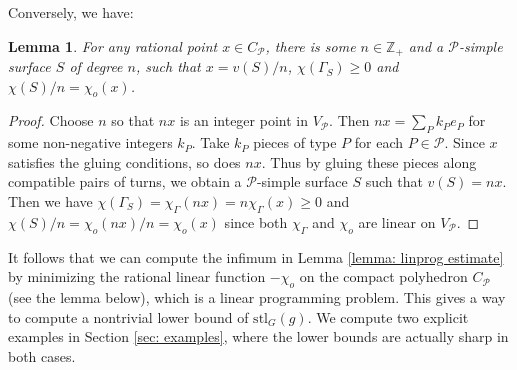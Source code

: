 \documentclass{amsart}
\newtheorem{lemma}[theorem]{Lemma}
\theoremstyle{definition}
\numberwithin{equation}{section}
\theoremstyle{theorem}
\theoremstyle{remark}
\def\Z{\mathbb Z}
\def\stl{\mathrm{stl}}
\begin{document}
	Conversely, we have:
	\begin{lemma}\label{lemma: vect to surf}
		For any rational point $x\in C_\mathcal{P}$, there is some $n\in\Z_+$ and a $\mathcal{P}$-simple surface $S$ of degree $n$, such that $x=v(S)/n$, $\chi(\Gamma_S)\ge0$ and $\chi(S)/n=\chi_o(x)$.
	\end{lemma}
	\begin{proof}
		Choose $n$ so that $nx$ is an integer point in $V_\mathcal{P}$. Then $nx=\sum_P k_P e_P$ for some non-negative integers $k_P$. Take $k_P$ pieces of type $P$ for each $P\in \mathcal{P}$. Since $x$ satisfies the gluing conditions, so does $nx$. Thus by gluing these pieces along compatible pairs of turns, we obtain a $\mathcal{P}$-simple surface $S$ such that $v(S)=nx$. Then we have $\chi(\Gamma_S)=\chi_\Gamma(nx)=n\chi_\Gamma(x)\ge0$ and $\chi(S)/n=\chi_o(nx)/n=\chi_o(x)$ since both $\chi_\Gamma$ and $\chi_o$ are linear on $V_\mathcal{P}$.
	\end{proof}
	
	It follows that we can compute the infimum in Lemma \ref{lemma: linprog estimate} by minimizing the rational linear function $-\chi_o$ on the compact polyhedron $C_\mathcal{P}$ (see the lemma below),  which is a linear programming problem. This gives a way to compute a nontrivial lower bound of $\stl_G(g)$. We compute two explicit examples in Section \ref{sec: examples}, where the lower bounds are actually sharp in both cases.
	
\end{document}
